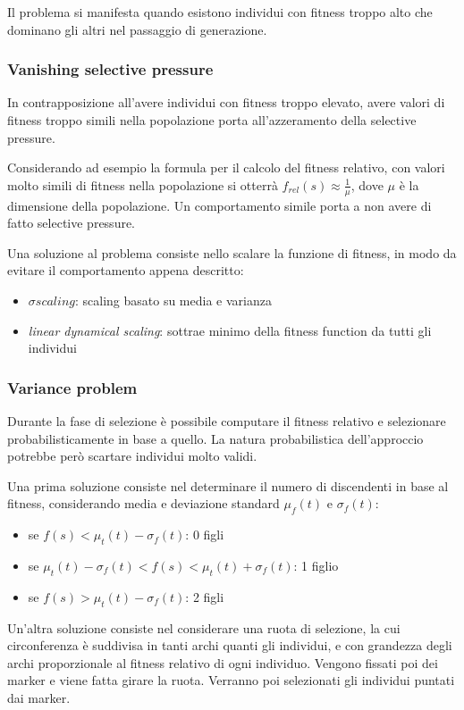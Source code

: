 \documentclass[a4paper]{article}
\begin{document}
Il problema si manifesta quando esistono individui con fitness troppo alto che dominano gli altri
nel passaggio di generazione.

\subsubsection{Vanishing selective pressure}
In contrapposizione all'avere individui con fitness troppo elevato, 
avere valori di fitness troppo simili nella popolazione porta all'azzeramento della selective pressure.

Considerando ad esempio la formula per il calcolo del fitness relativo, 
con valori molto simili di fitness nella popolazione si otterrà $f_{rel}(s) \approx \frac{1}{\mu}$, 
dove $\mu$ è la dimensione della popolazione.
Un comportamento simile porta a non avere di fatto selective pressure.

Una soluzione al problema consiste nello scalare la funzione di fitness, in 
modo da evitare il comportamento appena descritto:
\begin{itemize}
    \item $\sigma scaling$: scaling basato su media e varianza
    \item \emph{linear dynamical scaling}: sottrae minimo della fitness function da tutti gli individui 
\end{itemize}

\subsubsection{Variance problem}
Durante la fase di selezione è possibile computare il fitness relativo e selezionare 
probabilisticamente in base a quello.
La natura probabilistica dell'approccio potrebbe però scartare individui molto validi.

Una prima soluzione consiste nel determinare il numero di discendenti in base 
al fitness, considerando media e deviazione standard $\mu_f(t)$ e $\sigma_f(t)$:
\begin{itemize}
    \item se $f(s) < \mu_t(t) - \sigma_f(t)$: 0 figli
    \item se $\mu_t(t) - \sigma_f(t) < f(s) < \mu_t(t) + \sigma_f(t)$: 1 figlio
    \item se $f(s) > \mu_t(t) - \sigma_f(t)$: 2 figli
\end{itemize} 

Un'altra soluzione consiste nel considerare una ruota di selezione, 
la cui circonferenza è suddivisa in tanti archi quanti gli individui, e con grandezza
degli archi proporzionale al fitness relativo di ogni individuo.
Vengono fissati poi dei marker e viene fatta girare la ruota.
Verranno poi selezionati gli individui puntati dai marker.
\end{document}
